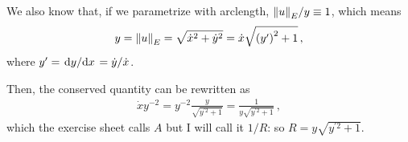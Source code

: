 \documentclass[main.tex]{subfiles}
\begin{document}
We also know that, if we parametrize with arclength, \(\norm{u}_{E} / y \equiv 1 \), which means 
%
\begin{align}
  y = \norm{u}_{E} = \sqrt{\dot{x}^2 + \dot{y}^2} = \dot{x} \sqrt{\qty(y^{\prime })^2 + 1}
\,,
\end{align}
%
where \(y^{\prime } = \dv*{y}{x} = \dot{y} / \dot{x}\).

Then, the conserved quantity can be rewritten as 
%
\begin{align}
  \dot{x} y^{-2} = y^{-2} \frac{y}{\sqrt{y^{\prime 2} +1}}
  = \frac{1}{y \sqrt{y^{\prime 2} + 1}}
\,,
\end{align}
%
which the exercise sheet calls \(A\) but I will call it \(1/R\): so \(R = y \sqrt{y^{\prime 2}+1}\). 






\end{document}
